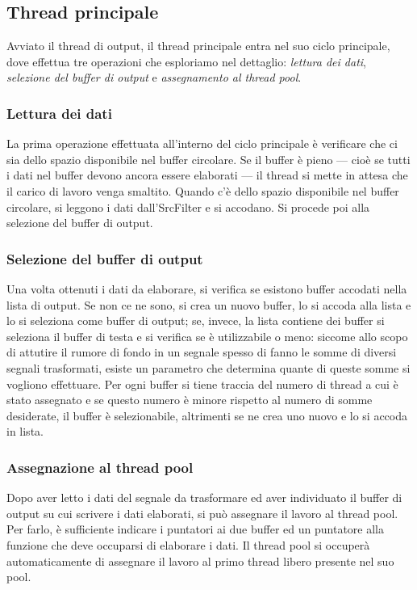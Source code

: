 \subsection{Thread principale}
\label{main_thread}
Avviato il thread di output, il thread principale entra nel suo ciclo
principale, dove effettua tre operazioni che esploriamo nel dettaglio:
\emph{lettura dei dati}, \emph{selezione del buffer di output} e
\emph{assegnamento al thread pool}.
\subsubsection{Lettura dei dati}
La prima operazione effettuata all'interno del ciclo principale \`e verificare
che ci sia dello spazio disponibile nel buffer circolare. Se il buffer \`e
pieno --- cio\`e se tutti i dati nel buffer devono ancora essere elaborati ---
il thread si mette in attesa che il carico di lavoro venga smaltito. Quando
c'\`e dello spazio disponibile nel buffer circolare, si leggono i dati
dall'SrcFilter e si accodano. Si procede poi alla selezione del buffer di
output.
\subsubsection{Selezione del buffer di output}
Una volta ottenuti i dati da elaborare, si verifica se esistono buffer accodati
nella lista di output. Se non ce ne sono, si crea un nuovo buffer, lo si accoda
alla lista e lo si seleziona come buffer di output; se, invece, la lista
contiene dei buffer si seleziona il buffer di testa e si verifica se \`e
utilizzabile o meno: siccome allo scopo di attutire il rumore di fondo in un
segnale spesso di fanno le somme di diversi segnali trasformati, esiste un
parametro che determina quante di queste somme si vogliono effettuare. Per ogni
buffer si tiene traccia del numero di thread a cui \`e stato assegnato e se
questo numero \`e minore rispetto al numero di somme desiderate, il buffer \`e
selezionabile, altrimenti se ne crea uno nuovo e lo si accoda in lista.
\subsubsection{Assegnazione al thread pool}
Dopo aver letto i dati del segnale da trasformare ed aver individuato il buffer
di output su cui scrivere i dati elaborati, si può assegnare il lavoro al thread
pool. Per farlo, \`e sufficiente indicare i puntatori ai due buffer ed un
puntatore alla funzione che deve occuparsi di elaborare i dati. Il thread pool
si occuper\`a automaticamente di assegnare il lavoro al primo thread libero
presente nel suo pool.
